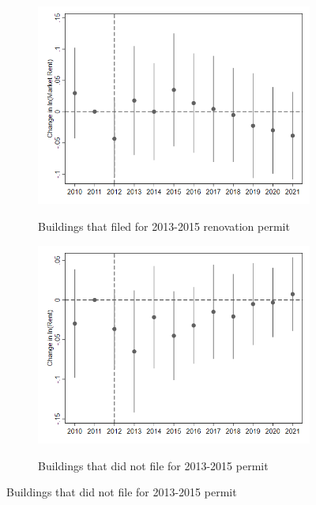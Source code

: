 \documentclass[12pt]{article}
\begin{document}
{{{{{{{{{\begin{figure}[h!]
\begin{center}
\caption{Differential Asking Rental Impacts for 2013-2015 Job Filings}
\begin{subfigure}[b]{0.4\textwidth}
\caption{Buildings that filed for 2013-2015 renovation permit}
\includegraphics[scale = 0.41]{Renovations/R7.5 High Surge Rent Job 2015 Impacts.png}
\label{fig:mktjob}
\end{subfigure}
\hfill
\begin{subfigure}[b]{0.4\textwidth}
\caption{Buildings that did not file for 2013-2015 permit}
\includegraphics[scale = 0.41]{Renovations/R7.5 High Surge NO Jobs 2015.png}
\label{fig:mktnojob}
\end{subfigure}
\end{center}
\end{figure}

}}}}}}}}}
\end{document}
